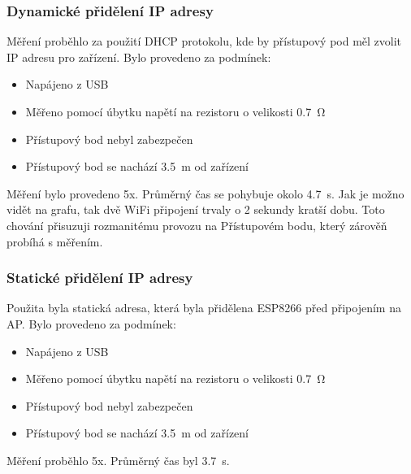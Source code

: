 \documentclass[a4paper, 12pt]{report}
\begin{document}
				\subsubsection{Dynamické přidělení IP adresy}
					Měření proběhlo za použití DHCP protokolu, kde by přístupový pod měl zvolit IP adresu pro zařízení. Bylo provedeno za podmínek:
					\begin{itemize}
						\item Napájeno z USB
						\item Měřeno pomocí úbytku napětí na rezistoru o velikosti \SI{0,7}{\ohm}
						\item Přístupový bod nebyl zabezpečen
						\item Přístupový bod se nachází \SI{3,5}{m} od zařízení
					\end{itemize}
					Měření bylo provedeno 5x. Průměrný čas se pohybuje okolo \SI{4,7}{s}. Jak je možno vidět na grafu, tak dvě WiFi připojení trvaly o 2 sekundy kratší dobu. Toto chování přisuzuji rozmanitému provozu na Přístupovém bodu, který zárověň probíhá s měřením.

				\subsubsection{Statické přidělení IP adresy}
					Použita byla statická adresa, která byla přidělena ESP8266 před připojením na AP. Bylo provedeno za podmínek:
					\begin{itemize}
						\item Napájeno z USB
						\item Měřeno pomocí úbytku napětí na rezistoru o velikosti \SI{0,7}{\ohm}
						\item Přístupový bod nebyl zabezpečen
						\item Přístupový bod se nachází \SI{3,5}{m} od zařízení
					\end{itemize}
					Měření proběhlo 5x. Průměrný čas byl \SI{3,7}{s}.\\
\end{document}
